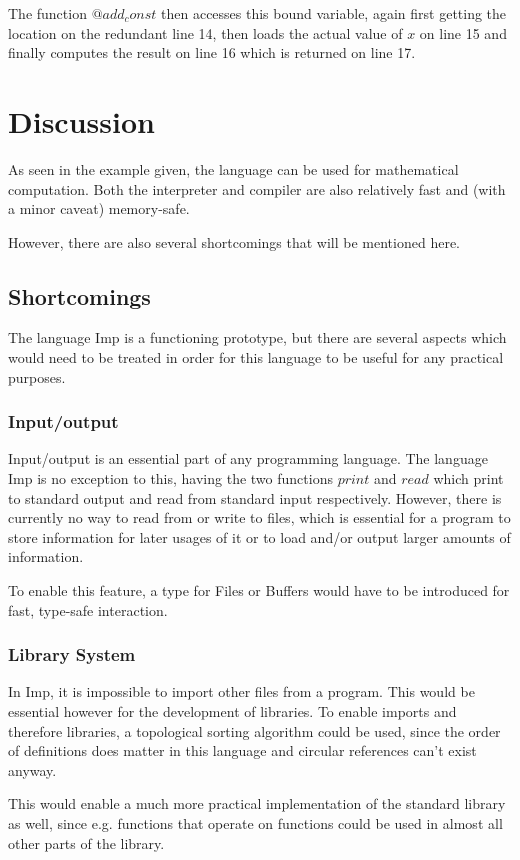 \documentclass[12pt]{article}
\begin{document}
The function $@add_const$ then accesses this bound variable, again first getting the
location on the redundant line 14, then loads the actual value of $x$ on line 15
and finally computes the result on line 16 which is returned on line 17.
\section{Discussion}
As seen in the example given, the language
can be used for mathematical computation.
Both the interpreter and compiler are also relatively fast and
(with a minor caveat) memory-safe.

However, there are also several
shortcomings that will be mentioned here.

\subsection{Shortcomings}\label{shortcomings}
The language Imp is a functioning prototype, but there are several
aspects which would need to be treated in order for this language
to be useful for any practical purposes.

\subsubsection{Input/output}
Input/output is an essential part of any programming language.
The language Imp is no exception to this, having the two functions
$print$ and $read$ which print to standard output and read from
standard input respectively. However, there is currently no way
to read from or write to files, which is essential for a program
to store information for later usages of it or to load and/or output larger
amounts of information.

To enable this feature, a type for Files or Buffers would have to be
introduced for fast, type-safe interaction.

\subsubsection{Library System}
In Imp, it is impossible to import other files from a program.
This would be essential however for the development of libraries.
To enable imports and therefore libraries, a topological sorting
algorithm could be used, since the order of definitions does
matter in this language and circular references can't exist anyway.

This would enable a much more practical implementation of the standard
library as well, since e.g. functions that operate on functions could be used
in almost all other parts of the library.
\end{document}
